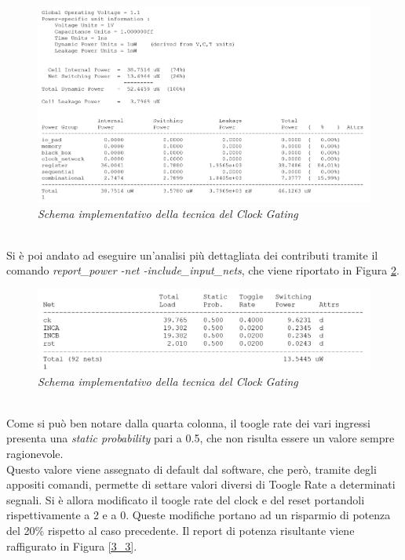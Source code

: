 {\begin{figure}[!htb]
	\centering
	\includegraphics[scale=0.8]{immagini/3_1}
	\caption{\textit{Schema implementativo della tecnica del Clock Gating}}
	\label{3_1}
\end{figure}
\\
Si è poi andato ad eseguire un'analisi più dettagliata dei contributi tramite il comando \textit{report\_power -net -include\_input\_nets}, che viene riportato in Figura \ref{3_2}. \\
\begin{figure}[!htb]
	\centering
	\includegraphics[scale=0.8]{immagini/3_2}
	\caption{\textit{Schema implementativo della tecnica del Clock Gating}}
	\label{3_2}
\end{figure}
\\
Come si può ben notare dalla quarta colonna, il toogle rate dei vari ingressi presenta una \textit{static probability} pari a 0.5, che non risulta essere un valore sempre ragionevole. \\
Questo valore viene assegnato di default dal software, che però, tramite degli appositi comandi, permette di settare valori diversi di Toogle Rate a determinati segnali. Si è allora modificato il toogle rate del clock e del reset portandoli rispettivamente a 2 e a 0. Queste modifiche portano ad un risparmio di potenza del 20\% rispetto al caso precedente. Il report di potenza risultante viene raffigurato in Figura \ref{3_3}.
\begin{figure}[!htb]

\end{figure}}
